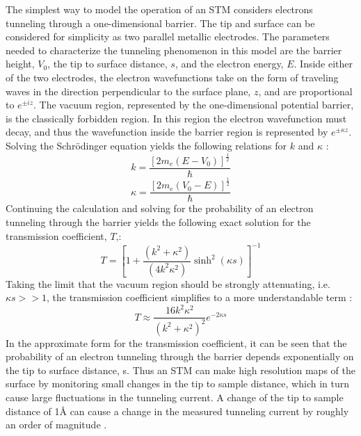 The simplest way to model the operation of an STM considers electrons tunneling through a one-dimensional barrier. The tip and surface can be considered for simplicity as two parallel metallic electrodes. The parameters needed to characterize the tunneling phenomenon in this model are the barrier height, $V_0$, the tip to surface distance, $s$, and the electron energy, $E$. Inside either of the two electrodes, the electron wavefunctions take on the form of traveling waves in the direction perpendicular to the surface plane, $z$, and are proportional to $e^{\pm i z}$. The vacuum region, represented by the one-dimensional potential barrier, is the classically forbidden region. In this region the electron wavefunction must decay, and thus the wavefunction inside the barrier region is represented by $e^{\pm \kappa z}$. Solving the Schr\"odinger equation yields the following relations for $k$ and $\kappa$ \cite{SPM-methods}:
\begin{equation}
k = \frac{[2 m_e (E - V_0)]^{\frac{1}{2}}}{\hbar}
\end{equation}
\begin{equation}
\label{eq:stm}
\kappa = \frac{[2 m_e (V_0 - E)]^{\frac{1}{2}}}{\hbar}
\end{equation}
Continuing the calculation and solving for the probability of an electron tunneling through the barrier yields the following exact solution for the transmission coefficient, $T$,\cite{SPM-methods}:
\begin{equation}
T = [1 + \frac{(k^2 + \kappa^2)}{(4k^2 \kappa^2)} \sinh^2{(\kappa s)}]^{-1}
\end{equation}
Taking the limit that the vacuum region should be strongly attenuating, i.e. $\kappa s >> 1$, the transmission coefficient simplifies to a more understandable term \cite{SPM-methods}:
\begin{equation}
\label{eq:stm2}
T \approx \frac{16k^2\kappa^2}{(k^2 +\kappa^2)^2}e^{-2\kappa s}
\end{equation}
In the approximate form for the transmission coefficient, it can be seen that the probability of an electron tunneling through the barrier depends exponentially on the tip to surface distance, s. Thus an STM can make high resolution maps of the surface by monitoring small changes in the tip to sample distance, which in turn cause large fluctuations in the tunneling current. A change of the tip to sample distance of 1{\AA} can cause a change in the measured tunneling current by roughly an order of magnitude \cite{SPM-methods, BinnigRohrerSTM}.


